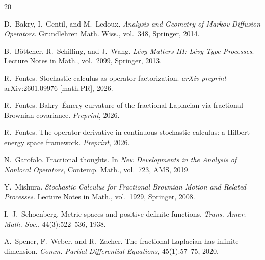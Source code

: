 \documentclass[11pt,a4paper]{article}
\theoremstyle{plain}
\theoremstyle{definition}
\theoremstyle{remark}
\begin{document}
\begin{thebibliography}{20}

D.~Bakry, I.~Gentil, and M.~Ledoux.
\newblock \emph{Analysis and Geometry of Markov Diffusion Operators}.
\newblock Grundlehren Math. Wiss., vol.~348, Springer, 2014.

B.~B\"ottcher, R.~Schilling, and J.~Wang.
\newblock \emph{L\'evy Matters III: L\'evy-Type Processes}.
\newblock Lecture Notes in Math., vol.~2099, Springer, 2013.

R.~Fontes.
\newblock Stochastic calculus as operator factorization.
\newblock \emph{arXiv preprint} arXiv:2601.09976 [math.PR], 2026.

R.~Fontes.
\newblock Bakry--\'Emery curvature of the fractional Laplacian
  via fractional Brownian covariance.
\newblock \emph{Preprint}, 2026.

R.~Fontes.
\newblock The operator derivative in continuous stochastic calculus:
  a Hilbert energy space framework.
\newblock \emph{Preprint}, 2026.

N.~Garofalo.
\newblock Fractional thoughts.
\newblock In \emph{New Developments in the Analysis of Nonlocal Operators},
  Contemp. Math., vol.~723, AMS, 2019.

Y.~Mishura.
\newblock \emph{Stochastic Calculus for Fractional Brownian Motion
  and Related Processes}.
\newblock Lecture Notes in Math., vol.~1929, Springer, 2008.

I.~J.~Schoenberg.
\newblock Metric spaces and positive definite functions.
\newblock \emph{Trans. Amer. Math. Soc.}, 44(3):522--536, 1938.

A.~Spener, F.~Weber, and R.~Zacher.
\newblock The fractional {L}aplacian has infinite dimension.
\newblock \emph{Comm. Partial Differential Equations}, 45(1):57--75, 2020.

\end{thebibliography}
\end{document}
